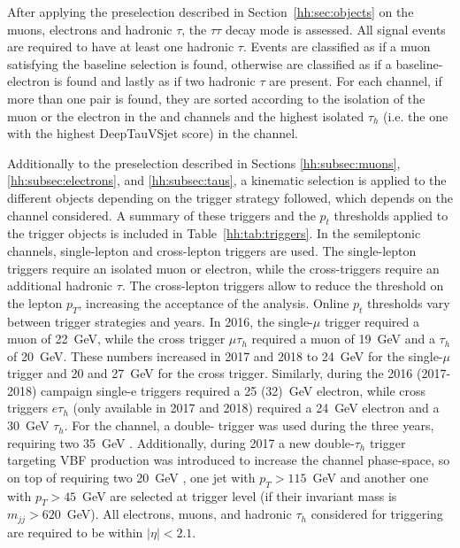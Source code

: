\documentclass[../main.tex]{subfiles}
\begin{document}
After applying the preselection described in Section~\ref{hh:sec:objects} on the muons, electrons and hadronic $\tau$, the $\tau\tau$ decay mode is assessed. All signal events are required to have at least one hadronic $\tau$. Events are classified as \taumu\tauh{} if a muon satisfying the baseline selection is found, otherwise are classified as \taue\tauh{} if a baseline-electron is found and lastly as \tauh\tauh{} if two hadronic $\tau$ are present. For each channel, if more than one pair is found, they are sorted according to the isolation of the muon or the electron in the \taumu\tauh{} and \taue\tauh{} channels and the highest isolated $\tau_h$ (i.e. the one with the highest DeepTauVSjet score) in the \tauh\tauh{} channel.

Additionally to the preselection described in Sections \ref{hh:subsec:muons}, \ref{hh:subsec:electrons}, and \ref{hh:subsec:taus}, a kinematic selection is applied to the different objects depending on the trigger strategy followed, which depends on the channel considered. A summary of these triggers and the $p_t$ thresholds applied to the trigger objects is included in Table~\ref{hh:tab:triggers}. In the semileptonic channels, single-lepton and cross-lepton triggers are used. The single-lepton triggers require an isolated muon or electron, while the cross-triggers require an additional hadronic $\tau$. The cross-lepton triggers allow to reduce the threshold on the lepton $p_T$, increasing the acceptance of the analysis. Online $p_t$ thresholds vary between trigger strategies and years. In 2016, the single-$\mu$ trigger required a muon of 22~GeV, while the cross trigger $\mu\tau_h$ required a muon of 19~GeV and a $\tau_h$ of 20~GeV. These numbers increased in 2017 and 2018 to 24~GeV for the single-$\mu$ trigger and 20 and 27~GeV for the cross trigger. Similarly, during the 2016 (2017-2018) campaign single-e triggers required a 25 (32)~GeV electron, while cross triggers $e\tau_h$ (only available in 2017 and 2018) required a 24~GeV electron and a 30~GeV $\tau_h$. For the \tauh\tauh{} channel, a double-\tauh{} trigger was used during the three years, requiring two 35~GeV \tauh{}. Additionally, during 2017 a new double-$\tau_h$ trigger targeting VBF production was introduced to increase the \tauh\tauh{} channel phase-space, so on top of requiring two 20~GeV \tauh{}, one jet with $p_T>115$~GeV and another one with $p_T>45$~GeV are selected at trigger level (if their invariant mass is $m_{jj}>620$~GeV). All electrons, muons, and hadronic $\tau_h$ considered for triggering are required to be within $|\eta| < 2.1$.
\end{document}
